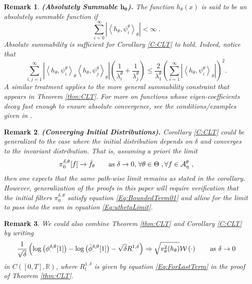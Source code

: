 \documentclass{article}
\newtheorem{remark}{ Remark}
\begin{document}
\begin{remark}\textbf{(Absolutely Summable $\mathbf{h_\theta}$).}
The function $h_\theta(x)$ is said to be an \textit{absolutely summable} function if
\[\sum_{i=0}^\infty|\left<h_\theta,\psi_i^\theta\right>_\theta|<\infty\ .\]
Absolute summability is sufficient for Corollary \ref{C:CLT} to hold. Indeed, notice that
\[
\sum_{i,j=1}^{\infty}|\left<h_{\theta},\psi_i^{\theta}\right>_{\theta}\left<h_{\theta},\psi_j^{\theta}\right>_{\theta}|\left(\frac{1}{\lambda_i^{\theta}}+\frac{1}{\lambda_j^{\theta}}\right)\leq \frac{2}{\lambda_1^{\theta}} \left(\sum_{i=1}^{\infty}|\left<h_{\theta},\psi_i^{\theta}\right>_{\theta}|\right)^{2}.
\]
A similar treatment applies to the more general summability constraint that appears in Theorem \ref{thm:CLT}. For more on functions whose eigen-coefficients decay fast enough to ensure absolute convergence, see the conditions/examples given in \cite{boyd2000,boyd1984}.
\end{remark}

\begin{remark}\textbf{(Converging Initial Distributions).}
Corollary \ref{C:CLT} could be generalized to the case where the initial distribution depends on $\delta$ and converges to the invariant distribution. That is, assuming a priori the limit
\[\pi_0^{\delta,\theta}[f]\rightarrow \bar f_\theta\qquad\hbox{as $\delta\rightarrow 0$, $\forall \theta\in\Theta$}\ ,\forall f\in\mathcal A_\eta^\theta\ ,\]
then one expects that the same path-wise limit remains as stated in the corollary. However, generalization of the proofs in this paper will require verification that the initial filters $\pi_0^{\delta,\theta}$ satisfy equation \eqref{Eq:BoundedTerm01} and allow for the limit to pass into the sum in equation \eqref{Eq:uthetaLimit}.
\end{remark}

\begin{remark}
We could also combine Theorem \ref{thm:CLT} and Corollary \ref{C:CLT} by writing
\[\frac{1}{\sqrt\delta}\left(\log\left( \phi^{\delta,\theta}_{\cdot}[1]\right)-\log\left( \bar\phi^{\delta,\theta}_{\cdot}[1]\right)-\sqrt \delta R_\cdot^{1,\delta}\right)\Rightarrow\sqrt{v^{2}_{\theta}(h_{\theta})}\mathcal W\left(\cdot\right)\qquad\hbox{as }\delta\rightarrow 0 \]
in $C([0,T],\mathbb R)$, where $R_t^{1,\delta}$ is given by equation \eqref{Eq:ForLastTerm} in the proof of Theorem \ref{thm:CLT}.
\end{remark}
\end{document}
